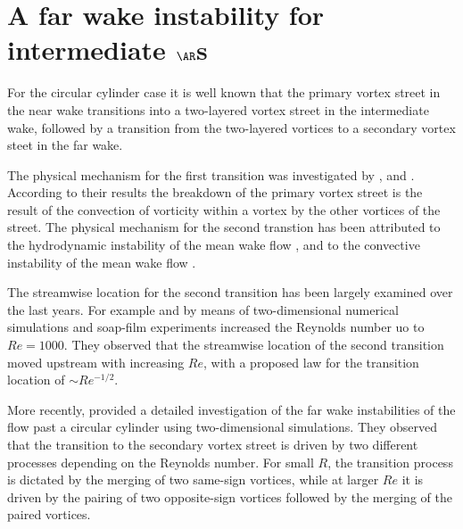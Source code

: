 \section{A far wake instability for intermediate $\AR$s}

For the circular cylinder case it is well known \citep{vorobieff-goergiev-ingber-2002,kumar-mittal-2012} that the primary vortex street in the near wake transitions into a two-layered vortex street in the intermediate wake, followed by a transition from the two-layered vortices to a secondary vortex steet in the far wake.

The physical mechanism for the first transition was investigated by \cite{durgin-karlsson-1971}, \cite{karasudani-funakoshi-1994} and \cite{dynnikova-guverntuk-2016}. According to their results the breakdown of the primary vortex street is the result of the convection of vorticity within a vortex by the other vortices of the street. The physical mechanism for the second transtion has been attributed to the hydrodynamic instability of the mean wake flow \citep{cimbala-nagib-roshko-1988,williamson-prasad-1993}, and to the convective instability of the mean wake flow \citep{kumar-mittal-2012}.

The streamwise location for the second transition has been largely examined over the last years. For example \cite{inoue-yamazaki-1999} and  \cite{vorobieff-etal-2002} by means of two-dimensional numerical simulations and soap-film experiments increased the Reynolds number uo to $Re=1000$. They observed that the streamwise location of the second transition moved upstream with increasing $Re$, with a proposed law for the transition location of $\sim Re^{-1/2}$. 

More recently, \cite{jiang-cheng-2019} provided a detailed investigation of the far wake instabilities of the flow past a circular cylinder using two-dimensional simulations. They observed that the transition to the secondary vortex street is driven by two different processes depending on the Reynolds number. For small $R$, the transition process is dictated by the merging of two same-sign vortices, while at larger $Re$ it is driven by the pairing of two opposite-sign vortices followed by the merging of the paired vortices.


